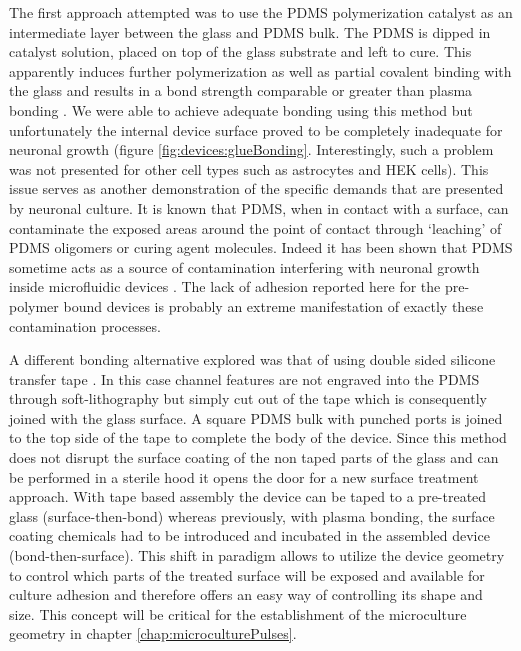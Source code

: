         The first approach attempted was to use the PDMS polymerization catalyst as an intermediate layer between the glass and PDMS bulk. The PDMS is dipped in catalyst solution, placed on top of the glass substrate and left to cure. This apparently induces further polymerization as well as partial covalent binding with the glass and results in a bond strength comparable or greater than plasma bonding \cite{samel2007fabrication}. We were able to achieve adequate bonding using this method but unfortunately the internal device surface proved to be completely inadequate for neuronal growth (figure \ref{fig:devices:glueBonding}. Interestingly, such a problem was not presented for other cell types such as astrocytes and HEK cells). This issue serves as another demonstration of the specific demands that are presented by neuronal culture. It is known that PDMS, when in contact with a surface, can contaminate the exposed areas around the point of contact through `leaching' of PDMS oligomers or curing agent molecules. Indeed it has been shown that PDMS sometime acts as a source of contamination interfering with neuronal growth inside microfluidic devices \cite{millet2007microfluidic}. The lack of adhesion reported here for the pre-polymer bound devices is probably an extreme manifestation of exactly these contamination processes.

        A different bonding alternative explored was that of using double sided silicone transfer tape \cite{nath2010rapid}. In this case channel features are not engraved into the PDMS through soft-lithography but simply cut out of the tape which is consequently joined with the glass surface. A square PDMS bulk with punched ports is joined to the top side of the tape to complete the body of the device. Since this method does not disrupt the surface coating of the non taped parts of the glass and can be performed in a sterile hood it opens the door for a new surface treatment approach. With tape based assembly the device can be taped to a pre-treated glass (surface-then-bond) whereas previously, with plasma bonding, the surface coating chemicals had to be introduced and incubated in the assembled device (bond-then-surface). This shift in paradigm allows to utilize the device geometry to control which parts of the treated surface will be exposed and available for culture adhesion and therefore offers an easy way of controlling its shape and size. This concept will be critical for the establishment of the microculture geometry in chapter \ref{chap:microculturePulses}.

